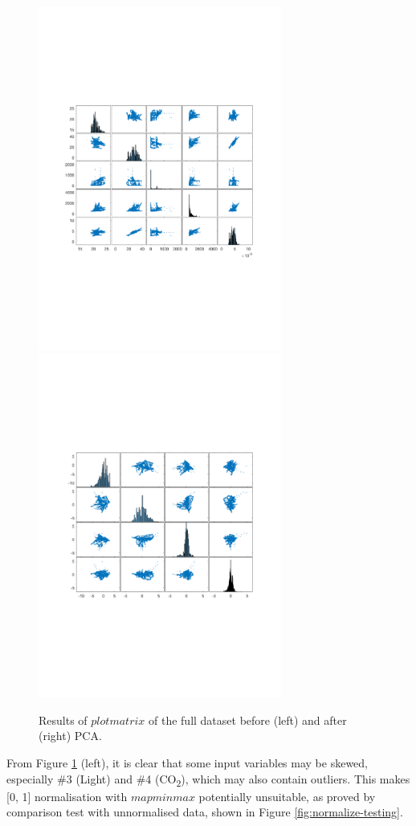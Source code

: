 \documentclass[10pt, oneside]{article}
\begin{document}
\begin{figure}[h]
\begin{center}
\includegraphics[width=8cm]{plotmatrix1.pdf}
\includegraphics[width=8cm]{plotmatrix2.pdf}
\end{center}
\caption{\label{fig:pca-before-after} Results of $plotmatrix$ of the full dataset before (left) and after (right) PCA.}
\end{figure}

From Figure \ref{fig:pca-before-after} (left), it is clear that some input variables may be skewed, especially \#3 (Light) and \#4 (CO\textsubscript{2}), which may also contain outliers. This makes [0, 1] normalisation with $mapminmax$ potentially unsuitable, as proved by comparison test with unnormalised data, shown in Figure \ref{fig:normalize-testing}.
\end{document}
